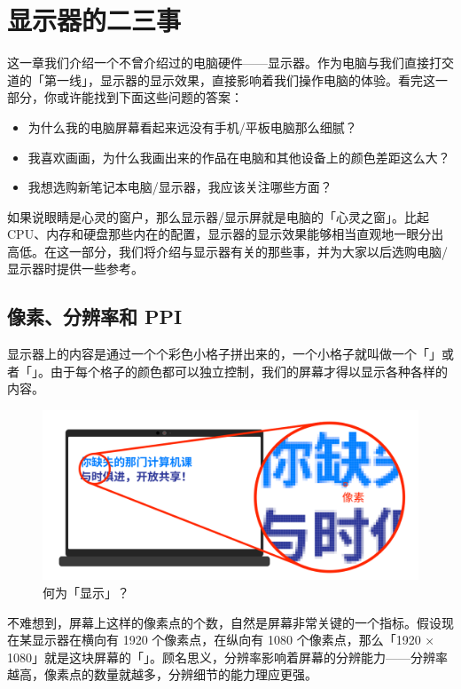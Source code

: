 \chapter{显示器的二三事}
\label{cha:screens-and-their-secrets}

\begin{intro}
  这一章我们介绍一个不曾介绍过的电脑硬件——显示器。作为电脑与我们直接打交道的「第一线」，显示器的显示效果，直接影响着我们操作电脑的体验。看完这一部分，你或许能找到下面这些问题的答案：
  \begin{itemize}
    \item 为什么我的电脑屏幕看起来远没有手机/平板电脑那么细腻？
    \item 我喜欢画画，为什么我画出来的作品在电脑和其他设备上的颜色差距这么大？
    \item 我想选购新笔记本电脑/显示器，我应该关注哪些方面？
  \end{itemize}
\end{intro}

如果说眼睛是心灵的窗户，那么显示器/显示屏就是电脑的「心灵之窗」。比起 CPU、内存和硬盘那些内在的配置，显示器的显示效果能够相当直观地一眼分出高低。在这一部分，我们将介绍与显示器有关的那些事，并为大家以后选购电脑/显示器时提供一些参考。

\section{像素、分辨率和 PPI}

显示器上的内容是通过一个个彩色小格子拼出来的，一个小格子就叫做一个「」或者「」。由于每个格子的颜色都可以独立控制，我们的屏幕才得以显示各种各样的内容。

\begin{figure}[htb!]
  \centering
  \includegraphics[width=.7\textwidth]{assets/advanced/Pixels.png}
  \caption{何为「显示」？}
  \label{fig:Pixels}
\end{figure}

不难想到，屏幕上这样的像素点的个数，自然是屏幕非常关键的一个指标。假设现在某显示器在横向有 1920 个像素点，在纵向有 1080 个像素点，那么「1920 × 1080」就是这块屏幕的「」。顾名思义，分辨率影响着屏幕的分辨能力——分辨率越高，像素点的数量就越多，分辨细节的能力理应更强。

